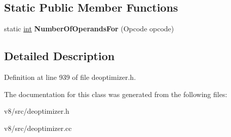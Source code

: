 \subsection*{Static Public Member Functions}
\begin{DoxyCompactItemize}
\item 
\mbox{\label{classv8_1_1internal_1_1Translation_aae5854481a40d485036ddae10a96d635}} 
static \mbox{\hyperlink{classint}{int}} {\bfseries Number\+Of\+Operands\+For} (Opcode opcode)
\end{DoxyCompactItemize}


\subsection{Detailed Description}


Definition at line 939 of file deoptimizer.\+h.



The documentation for this class was generated from the following files\+:\begin{DoxyCompactItemize}
\item 
v8/src/deoptimizer.\+h\item 
v8/src/deoptimizer.\+cc\end{DoxyCompactItemize}
